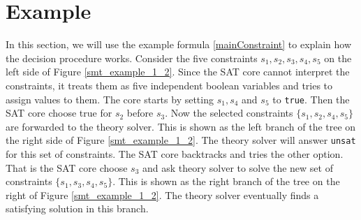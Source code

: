 \section{Example}
In this section, we will use the example formula \ref{mainConstraint} to explain how the decision procedure works. Consider the five constraints $s_1,s_2, s_3,s_4,s_5$ on the left side of Figure \ref{smt_example_1_2}. Since the SAT core cannot interpret the constraints, it treats them as five independent boolean variables and tries to assign values to them. The core starts by setting $s_1, s_4$ and $s_5$ to \texttt{true}. Then the SAT core choose true for $s_2$ before $s_3$.  Now the selected constraints $\{ s_1,s_2, s_4,s_5\}$  are forwarded to the theory solver. This is shown as the left branch of the tree on the right side of Figure \ref{smt_example_1_2}. The theory solver will answer \texttt{unsat} for this set of constraints. The SAT core backtracks and tries the other option. That is the SAT core choose $s_3$ and ask theory solver to solve the new set of constraints  $\{ s_1,s_3, s_4,s_5\}$. This is shown as the right branch of the tree on the right of Figure \ref{smt_example_1_2}. The theory solver eventually finds a satisfying solution in this branch. 


